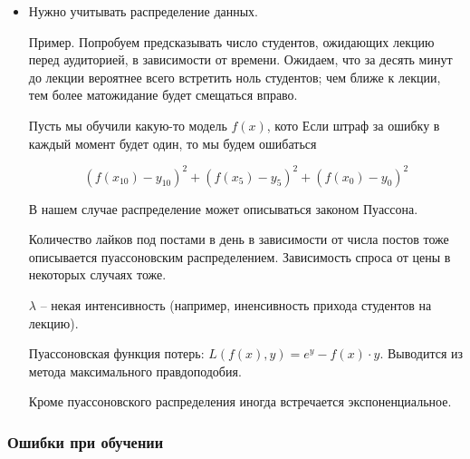 \documentclass[main.tex]{subfiles}
\begin{document}
\begin{itemize}[noitemsep]
	\item Нужно учитывать распределение данных. %
	
	Пример.
	Попробуем предсказывать число студентов, ожидающих лекцию перед аудиторией, в зависимости от времени.
	Ожидаем, что за десять минут до лекции вероятнее всего встретить ноль студентов; чем ближе к лекции, тем более матожидание будет смещаться вправо.
	
	Пусть мы обучили какую-то модель $ f(x) $, кото %
	Если штраф за ошибку в каждый момент будет один, то мы будем ошибаться %
	
	\[ (f(x_{10}) - y_{10})^2 + (f(x_{5}) - y_{5})^2 + (f(x_{0}) - y_{0})^2 \]
	
	В нашем случае распределение может описываться законом Пуассона.
	
	Количество лайков под постами в день в зависимости от числа постов тоже описывается пуассоновским распределением.
	Зависимость спроса от цены в некоторых случаях тоже.
	
	$ \lambda $ -- некая интенсивность (например, иненсивность прихода студентов на лекцию).
	
	Пуассоновская функция потерь: $ L(f(x),y) = e^y - f(x) \cdot y $.
	Выводится из метода максимального правдоподобия.
	
	Кроме пуассоновского распределения иногда встречается экспоненциальное.
	
\end{itemize}

\subsubsection{Ошибки при обучении}
\end{document}
